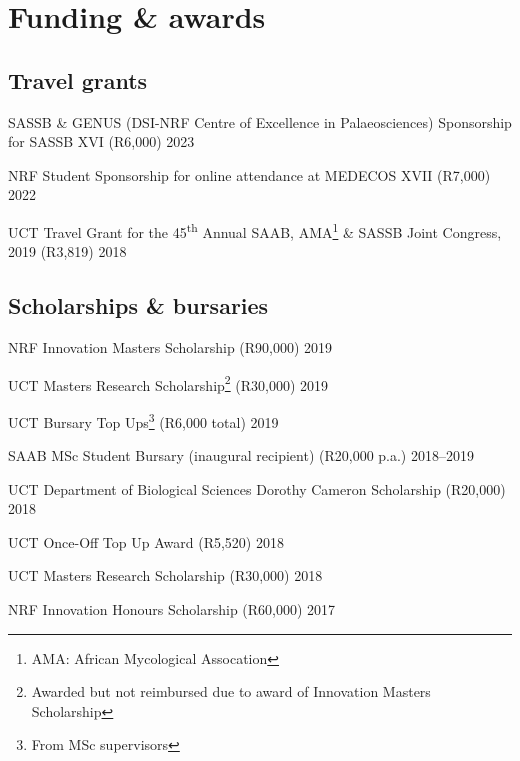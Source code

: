 \documentclass[10pt]{article}
\begin{document}
\vfill

\clearpage %

\section*{Funding \& awards} %

\subsection*{Travel grants}

SASSB \& GENUS (DSI-NRF Centre of Excellence in Palaeosciences) Sponsorship for SASSB XVI (R6,000)                                   \hfill 2023

NRF Student Sponsorship for online attendance at MEDECOS XVII
  (R7,000)                                                           \hfill 2022

UCT Travel Grant for the 45\textsuperscript{th} Annual SAAB,
  AMA\footnote{AMA: African Mycological Assocation} \& SASSB Joint
  Congress, 2019 (R3,819)                                            \hfill 2018

\subsection*{Scholarships \& bursaries}

NRF Innovation Masters Scholarship (R90,000)                         \hfill 2019

UCT Masters Research Scholarship\footnote{Awarded but not reimbursed
  due to award of Innovation Masters Scholarship} (R30,000)          \hfill 2019

UCT Bursary Top Ups\footnote{From MSc supervisors} (R6,000 total)    \hfill 2019

SAAB MSc Student Bursary (inaugural recipient) (R20,000 p.a.)  \hfill 2018--2019

UCT Department of Biological Sciences Dorothy Cameron Scholarship
  (R20,000)                                                          \hfill 2018

UCT Once-Off Top Up Award (R5,520)                                   \hfill 2018

UCT Masters Research Scholarship (R30,000)                           \hfill 2018

NRF Innovation Honours Scholarship (R60,000)                         \hfill 2017
\end{document}
